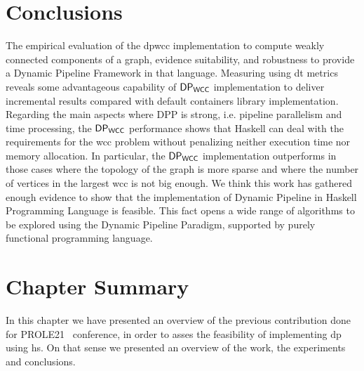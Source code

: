 \section{Conclusions}
The empirical evaluation of the \acrshort{dpwcc} implementation to compute weakly connected components of a graph, evidence suitability, 
and robustness to provide a Dynamic Pipeline Framework in that language. Measuring  using \acrshort{dt} metrics 
reveals some advantageous capability of $\mathsf{DP_{WCC}}$ implementation to deliver incremental results compared with default containers library implementation. 
Regarding the main aspects where DPP is strong, i.e. pipeline parallelism and time processing, the $\mathsf{DP_{WCC}}$ performance shows that Haskell 
can deal with the requirements for the \acrshort{wcc} problem without penalizing neither execution time nor memory allocation. 
In particular, the $\mathsf{DP_{WCC}}$ implementation outperforms in those cases where the topology of the graph is more sparse and where the number of 
vertices in the largest \acrshort{wcc} is not big enough. We think this work has gathered enough evidence to show that the implementation 
of Dynamic Pipeline in Haskell Programming Language is feasible. This fact opens a wide range of algorithms to be explored using the 
Dynamic Pipeline Paradigm, supported by purely functional programming language.

\section{Chapter Summary}
In this chapter we have presented an overview of the previous contribution done for PROLE21~\cite{prole21} conference, in order to asses the 
feasibility of implementing \acrshort{dp} using \acrshort{hs}. On that sense we presented an overview of the work, the experiments and conclusions.

